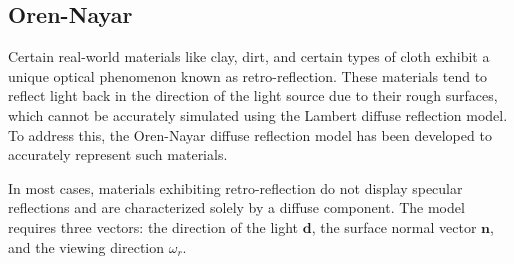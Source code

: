\subsection{Oren-Nayar}
Certain real-world materials like clay, dirt, and certain types of cloth exhibit a unique optical phenomenon known as retro-reflection. 
These materials tend to reflect light back in the direction of the light source due to their rough surfaces, which cannot be accurately simulated using the Lambert diffuse reflection model. 
To address this, the Oren-Nayar diffuse reflection model has been developed to accurately represent such materials.

In most cases, materials exhibiting retro-reflection do not display specular reflections and are characterized solely by a diffuse component. 
The model requires three vectors: the direction of the light $\mathbf{d}$, the surface normal vector $\mathbf{n}$, and the viewing direction $\omega_r$.

